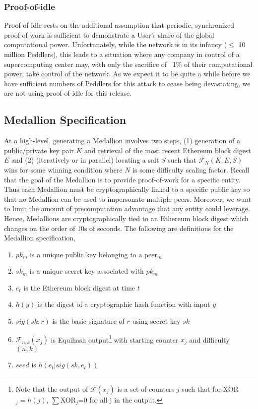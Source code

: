 \subsubsection*{Proof-of-idle}

Proof-of-idle rests on the additional assumption that periodic, synchronized proof-of-work is sufficient to demonstrate a User’s share of the global computational power. Unfortunately, while the network is in its infancy ($\leq$ 10 million Peddlers), this leads to a situation where any company in control of a supercomputing center may, with only the sacrifice of ~1\% of their computational power, take control of the network. As we expect it to be quite a while before we have sufficient numbers of Peddlers for this attack to cease being devastating, we are not using proof-of-idle for this release.

\subsection{Medallion Specification}
\label{medallion-spec}

At a high-level, generating a Medallion involves two steps, (1) generation of a public/private key pair $K$ and retrieval of the most recent Ethereum block digest $E$ and (2) (iteratively or in parallel) locating a salt $S$ such that $\mathcal{F}_{N}(K, E, S)$ wins for some winning condition where $N$ is some difficulty scaling factor. Recall that the goal of the Medallion is to provide proof-of-work for a specific entity. Thus each Medallion must be cryptographically linked to a specific public key so that no Medallion can be used to impersonate multiple peers. Moreover, we want to limit the amount of precomputation advantage that any entity could leverage. Hence, Medallions are cryptographically tied to an Ethereum block digest which changes on the order of 10s of seconds. The following are definitions for the Medallion specification,

\begin{enumerate}
	\item[] $pk_m$ is a unique public key belonging to a peer$_m$
    \item[] $sk_m$ is a unique secret key associated with $pk_m$
    \item[] $e_t$ is the Ethereum block digest at time $t$ 
    \item[] $h(y)$ is the digest of a cryptographic hash function with input $y$
    \item[] $sig(sk, r)$ is the basic signature of $r$ using secret key $sk$
    \item[] $\mathcal{F}_{n,k}(x_j)$ is Equihash output\footnote{Note that the output of $\mathcal{F}(x_j)$ is a set of counters $j$ such that for XOR$_j=h(j)$, $\sum$XOR$_j$=0 for all j in the output.} with starting counter $x_j$ and difficulty $(n,k)$
    \item[] $seed$ is $h(e_t|sig(sk,e_t))$
\end{enumerate}

